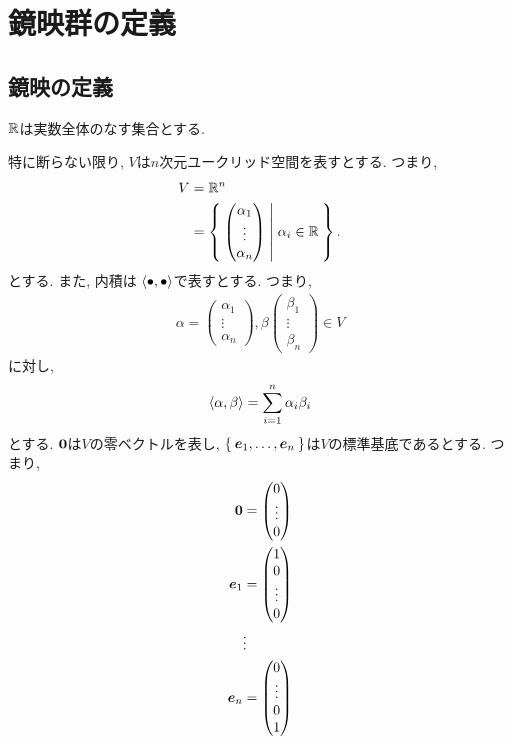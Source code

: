 \chapter{鏡映群の定義}
\section{鏡映の定義}
$\mathbb{R}$は実数全体のなす集合とする.

特に断らない限り,
$V$は$n$次元ユークリッド空間を表すとする.
つまり,
\begin{align*}
  V&=\mathbb{R}^n\\
  &=\Set{\begin{pmatrix}\alpha_1\\\vdots\\\alpha_n\end{pmatrix} | \alpha_i \in \mathbb{R}}.
\end{align*}
とする. また, 内積は $\Braket{\bullet,\bullet}$で表すとする.
つまり,
\begin{align*}
\alpha=\begin{pmatrix}\alpha_1\\\vdots\\\alpha_n\end{pmatrix},\beta\begin{pmatrix}\beta_1\\\vdots\\\beta_n\end{pmatrix}\in V
\end{align*}
に対し,
\begin{align*}
\Braket{\alpha,\beta}=\sum_{i=1}^n \alpha_i \beta_i
\end{align*}
とする.
$\boldsymbol{0}$は$V$の零ベクトルを表し,
$\Set{\boldsymbol{e}_1,\ldots,\boldsymbol{e}_n}$は$V$の標準基底であるとする.
つまり,
\begin{align*}
 \boldsymbol{0}&=\begin{pmatrix}0\\\vdots\\0\end{pmatrix}\\
 \boldsymbol{e}_1&=\begin{pmatrix}1\\0\\\vdots\\0\end{pmatrix}\\
 &\vdots\\
 \boldsymbol{e}_n&=\begin{pmatrix}0\\\vdots\\0\\1\end{pmatrix}
\end{align*}


